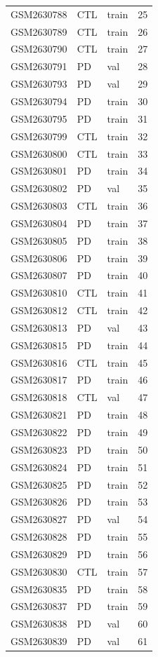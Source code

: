 \begin{footnotesize}
\begin{longtable}{llll}
GSM2630788 & CTL & train & 25 \\
GSM2630789 & CTL & train & 26 \\
GSM2630790 & CTL & train & 27 \\
GSM2630791 & PD & val & 28 \\
GSM2630793 & PD & val & 29 \\
GSM2630794 & PD & train & 30 \\
GSM2630795 & PD & train & 31 \\
GSM2630799 & CTL & train & 32 \\
GSM2630800 & CTL & train & 33 \\
GSM2630801 & PD & train & 34 \\
GSM2630802 & PD & val & 35 \\
GSM2630803 & CTL & train & 36 \\
GSM2630804 & PD & train & 37 \\
GSM2630805 & PD & train & 38 \\
GSM2630806 & PD & train & 39 \\
GSM2630807 & PD & train & 40 \\
GSM2630810 & CTL & train & 41 \\
GSM2630812 & CTL & train & 42 \\
GSM2630813 & PD & val & 43 \\
GSM2630815 & PD & train & 44 \\
GSM2630816 & CTL & train & 45 \\
GSM2630817 & PD & train & 46 \\
GSM2630818 & CTL & val & 47 \\
GSM2630821 & PD & train & 48 \\
GSM2630822 & PD & train & 49 \\
GSM2630823 & PD & train & 50 \\
GSM2630824 & PD & train & 51 \\
GSM2630825 & PD & train & 52 \\
GSM2630826 & PD & train & 53 \\
GSM2630827 & PD & val & 54 \\
GSM2630828 & PD & train & 55 \\
GSM2630829 & PD & train & 56 \\
GSM2630830 & CTL & train & 57 \\
GSM2630835 & PD & train & 58 \\
GSM2630837 & PD & train & 59 \\
GSM2630838 & PD & val & 60 \\
GSM2630839 & PD & val & 61 \\

\end{longtable}
\end{footnotesize}
